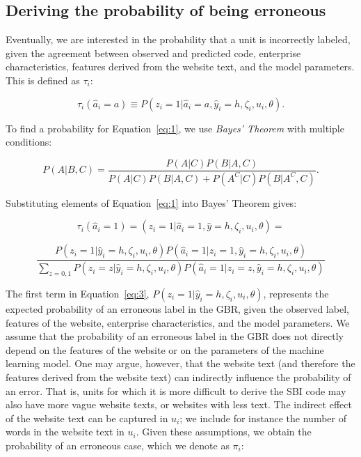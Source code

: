 \documentclass[12pt, a4paper, titlepage]{article}
\begin{document}
					\subsection{Deriving the probability of being erroneous}
					\label{section:probs}

Eventually, we are interested in the probability that a unit is incorrectly labeled, given the agreement between observed and predicted code, enterprise characteristics, features derived from the website text, and the model parameters. This is defined as $\tau_i$:

						\begin{equation} \label{eq:1}
\tau_i(\hat{a}_i = a) \equiv P(z_i = 1 | \hat{a}_i = a, \hat{y}_i = h, \zeta_i, u_i, \theta).
						\end{equation}

To find a probability for Equation~\ref{eq:1}, we use \textit{Bayes' Theorem} with multiple conditions:

						\begin{equation*} \label{eq:bayes}
P(A | B, C) =  \frac{P(A | C) P(B | A, C)}{P(A|C)P(B|A,C) + P(A^C|C)P(B|A^C, C)}   .
						\end{equation*}

Substituting elements of Equation~\ref{eq:1} into Bayes' Theorem gives: 

						\begin{equation}\label{eq:2}
\tau_i(\hat{a}_i = 1) = (z_i = 1 | \hat{a}_i = 1, \hat{y} = h, \zeta_i, u_i, \theta) = 
						\end{equation}

						\begin{equation}\label{eq:3}
\frac{P(z_i = 1|\hat{y}_i = h, \zeta_i, u_i, \theta)P(\hat{a}_i=1|z_i=1, \hat{y}_i = h, \zeta_i, u_i, \theta) }
{\sum_{z=0,1}P(z_i=z|\hat{y}_i = h, \zeta_i, u_i, \theta) P( \hat{a}_i=1|z_i=z, \hat{y}_i = h, \zeta_i, u_i, \theta  )} 
						\end{equation}


The first term in Equation~\ref{eq:3}, $P(z_i = 1|\hat{y}_i = h, \zeta_i, u_i, \theta)$, represents the expected probability of an erroneous label in the GBR, given the observed label, features of the website, enterprise characteristics, and the model parameters. We assume that the probability of an erroneous label in the GBR does not directly depend on the features of the website or on the parameters of the machine learning model. One may argue, however, that the website text (and therefore the features derived from the website text) can indirectly influence the probability of an error. That is, units for which it is more difficult to derive the SBI code may also have more vague website texts, or websites with less text. The indirect effect of the website text can be captured in $u_i$; we include for instance the number of words in the website text in $u_i$. Given these assumptions, we obtain the probability of an erroneous case, which we denote as $\pi_i$:
\end{document}
